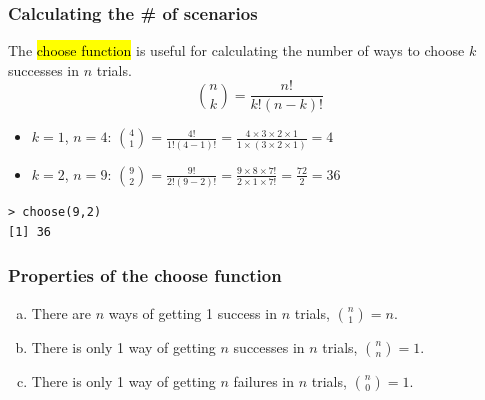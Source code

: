 
\begin{frame}[fragile]
\frametitle{Calculating the \# of scenarios}

{
The \hl{choose function} is useful for calculating the number of ways to choose $k$ successes in $n$ trials.
\[ {n \choose k} = \frac{n!}{k! (n - k)!} \]
}

\pause

\begin{itemize}

\item $k = 1$, $n = 4$: ${4 \choose 1} = \frac{4!}{1! (4 - 1)!} = \frac{4 \times 3 \times 2 \times 1}{1 \times (3 \times 2 \times 1)} = 4$

\pause

\item $k = 2$, $n = 9$: ${9 \choose 2} = \frac{9!}{2! (9 - 2)!} = \frac{9 \times 8 \times 7!}{2 \times 1 \times 7!} = \frac{72}{2} = 36$

\end{itemize}

\vfill

\begin{beamerboxesrounded}[shadow = true, lower = code body]{}
{\small
\begin{verbatim}
> choose(9,2)
[1] 36
\end{verbatim}
}
\end{beamerboxesrounded}

\end{frame}


\begin{frame}[fragile]
\frametitle{Properties of the choose function}


\begin{enumerate}[(a)]
\item There are $n$ ways of getting 1 success in $n$ trials, ${n \choose 1} = n$.
\item There is only 1 way of getting $n$ successes in $n$ trials, ${n \choose n} = 1$.
\item There is only 1 way of getting $n$ failures in $n$ trials, ${n \choose 0} = 1$.
\end{enumerate}

\end{frame}

